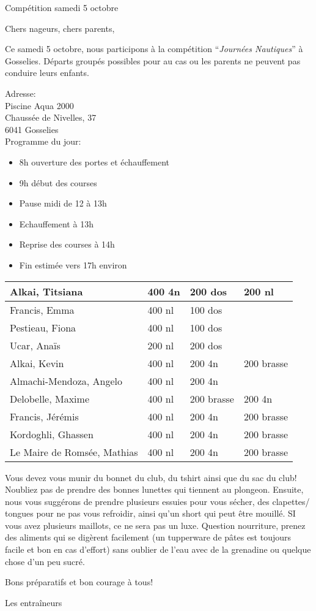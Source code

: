 \documentclass{article}
\begin{document}
\begin{center}\huge{Compétition samedi 5 octobre}\end{center}
\hspace{1cm}

Chers nageurs, chers parents,

Ce samedi 5 octobre, nous participons à la compétition ``\emph{Journées Nautiques}'' à Gosselies.
Départs groupés possibles pour au cas ou les parents ne peuvent pas conduire leurs enfants.

Adresse:\\
Piscine Aqua 2000\\
Chaussée de Nivelles, 37\\
6041 Gosselies\\

Programme du jour:
\begin{itemize}
\item 8h ouverture des portes et échauffement
\item 9h début des courses
\item Pause midi de 12 à 13h
\item Echauffement à 13h
\item Reprise des courses à 14h
\item Fin estimée vers 17h environ
\end{itemize}
\begin{table}[here!]
\centering
\begin{tabular}{|l|l|l|l|}
\hline
Alkai, Titsiana & 400 4n & 200 dos & 200 nl\\
\hline
Francis, Emma & 400 nl & 100 dos &\\
\hline
Pestieau, Fiona & 400 nl & 100 dos &\\
\hline
Ucar, Anaïs & 200 nl & 200 dos &\\
\hline
Alkai, Kevin & 400 nl & 200 4n & 200 brasse\\
\hline
Almachi-Mendoza, Angelo & 400 nl & 200 4n &\\
\hline
Delobelle, Maxime & 400 nl & 200 brasse & 200 4n\\
\hline
Francis, Jérémis & 400 nl & 200 4n & 200 brasse\\
\hline
Kordoghli, Ghassen & 400 nl & 200 4n & 200 brasse\\
\hline
Le Maire de Romsée, Mathias & 400 nl & 200 4n & 200 brasse\\
\hline
\end{tabular}
\end{table}

Vous devez vous munir du bonnet du club, du tshirt ainsi que du sac du club!
Noubliez pas de prendre des bonnes lunettes qui tiennent au plongeon.
Ensuite, nous vous suggérons de prendre plusieurs essuies pour vous sécher, des clapettes/ tongues pour ne pas vous refroidir, ainsi qu’un short qui peut être mouillé. SI vous avez plusieurs maillots, ce ne sera pas un luxe.
Question nourriture, prenez des aliments qui se digèrent facilement (un tupperware de pâtes est toujours facile et bon en cas d’effort) sans oublier de l’eau avec de la grenadine ou quelque chose d’un peu sucré.

Bons préparatifs et bon courage à tous!

Les entraîneurs
\end{document}
